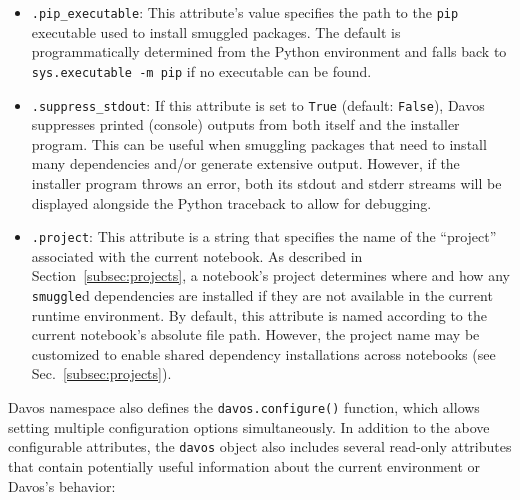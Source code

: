 \documentclass[preprint,12pt,a4paper]{elsarticle}
\begin{document}
\begin{itemize}
\item \texttt{.pip\_executable}: This attribute's value specifies the
  path to the \texttt{pip} executable used to install smuggled
  packages. The default is programmatically determined from the Python
  environment and falls back to \texttt{sys.executable -m pip} if no
  executable can be found.

\item \texttt{.suppress\_stdout}: If this attribute is set to
  \texttt{True} (default: \texttt{False}), Davos suppresses
  printed (console) outputs from both itself and the installer program.
  This can be useful when smuggling packages that need to install many
  dependencies and/or generate extensive output. However, if the installer
  program throws an error, both its stdout and stderr streams will be
  displayed alongside the Python traceback to allow for debugging.

\item \texttt{.project}: This attribute is a string that specifies the name of
the ``project'' associated with the current notebook. As described in
Section~\ref{subsec:projects}, a notebook's project determines where and how
any \texttt{smuggle}d dependencies are installed if they are not available in
the current runtime environment. By default, this attribute is named according
to the current notebook's absolute file path. However, the project name may be
customized to enable shared dependency installations across notebooks (see
Sec.~\ref{subsec:projects}).

\end{itemize}

\noindent Davos namespace also defines the \texttt{davos.configure()} function,
which allows setting multiple configuration options simultaneously. In addition
to the above configurable attributes, the \texttt{davos} object also includes
several read-only attributes that contain potentially useful information about
the current environment or Davos's behavior:
\end{document}
